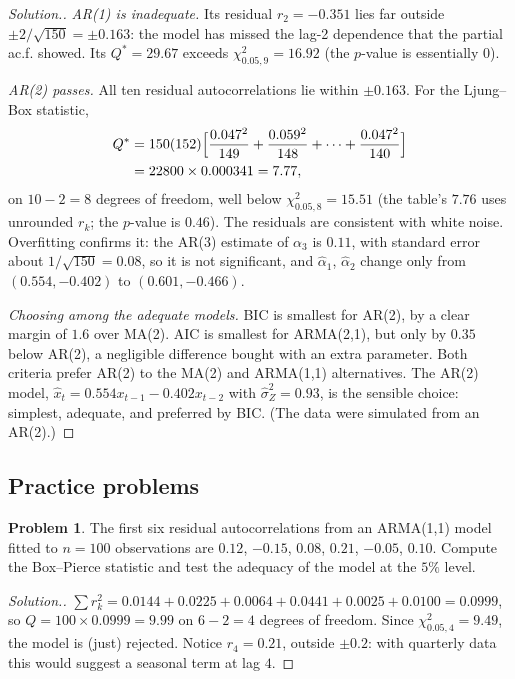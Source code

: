 \documentclass[11pt,a4paper]{article}
\theoremstyle{definition}
\newtheorem{problemx}{Problem}[subsection]
\newenvironment{problem}{\begin{problemx}}{\end{problemx}}
\newenvironment{solution}
  {\renewcommand{\qedsymbol}{}\begin{proof}[\textit{Solution}.]}
  {\end{proof}}
\begin{document}
\begin{solution}
\emph{AR(1) is inadequate.} Its residual $r_2 = -0.351$ lies far outside $\pm2/\sqrt{150} = \pm0.163$: the model has missed the lag-2
dependence that the partial ac.f. showed. Its $Q^* = 29.67$ exceeds $\chi^2_{0.05,9} = 16.92$ (the $p$-value is essentially $0$).

\emph{AR(2) passes.} All ten residual autocorrelations lie within $\pm0.163$. For the Ljung--Box statistic,
\begin{align*}
Q^* &= 150(152)\Bigl[\frac{0.047^2}{149} + \frac{0.059^2}{148} + \dots + \frac{0.047^2}{140}\Bigr] \\
&= 22800 \times 0.000341 = 7.77 ,
\end{align*}
on $10 - 2 = 8$ degrees of freedom, well below $\chi^2_{0.05,8} = 15.51$ (the table's $7.76$ uses unrounded $r_k$; the $p$-value is $0.46$). The residuals are
consistent with white noise. Overfitting confirms it: the AR(3) estimate of $\alpha_3$ is $0.11$, with standard error about
$1/\sqrt{150} = 0.08$, so it is not significant, and $\hat\alpha_1$, $\hat\alpha_2$ change only from $(0.554, -0.402)$ to $(0.601, -0.466)$.

\emph{Choosing among the adequate models.} BIC is smallest for AR(2), by a clear margin of $1.6$ over MA(2). AIC is smallest for
ARMA(2,1), but only by $0.35$ below AR(2), a negligible difference bought with an extra parameter. Both criteria
prefer AR(2) to the MA(2) and ARMA(1,1) alternatives. The AR(2) model, $\hat x_t = 0.554x_{t-1} - 0.402x_{t-2}$ with $\hat\sigma_Z^2 = 0.93$, is the sensible
choice: simplest, adequate, and preferred by BIC. (The data were simulated from an AR(2).)
\end{solution}

\subsection{Practice problems}
\begin{problem}\label{prob:box-pierce}
The first six residual autocorrelations from an ARMA(1,1) model fitted to $n = 100$ observations are $0.12$, $-0.15$, $0.08$, $0.21$, $-0.05$,
$0.10$. Compute the Box--Pierce statistic and test the adequacy of the model at the $5\%$ level.
\end{problem}

\begin{solution}
$\sum r_k^2 = 0.0144 + 0.0225 + 0.0064 + 0.0441 + 0.0025 + 0.0100 = 0.0999$, so $Q = 100 \times 0.0999 = 9.99$ on $6 - 2 = 4$ degrees of freedom. Since
$\chi^2_{0.05,4} = 9.49$, the model is (just) rejected. Notice $r_4 = 0.21$, outside $\pm0.2$: with quarterly data this would suggest a seasonal
term at lag $4$.
\end{solution}
\end{document}
